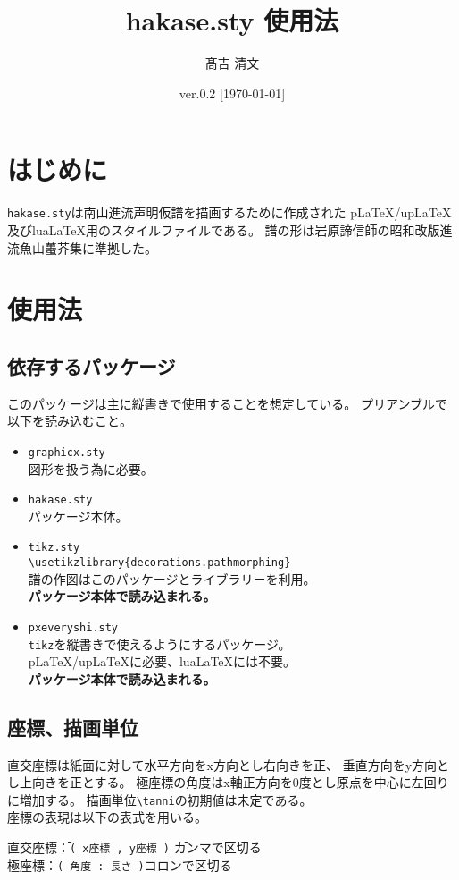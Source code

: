 \documentclass[a4paper,luatex]{l3doc}
\title{hakase.sty 使用法}
\author{髙吉 清文}
\date{ver.0.2 [\today]}
\begin{document}
\maketitle
\section{はじめに}
\verb|hakase.sty|は南山進流声明仮譜を描画するために作成された
p\LaTeX/up\LaTeX 及びlua\LaTeX 用のスタイルファイルである。
譜の形は岩原諦信師の昭和改版進流魚山蠆芥集に準拠した。
\section{使用法}
\subsection{依存するパッケージ}
このパッケージは主に縦書きで使用することを想定している。
プリアンブルで以下を読み込むこと。
\begin{itemize}
 \item \verb|graphicx.sty|\\
       図形を扱う為に必要。
 \item \verb|hakase.sty|\\
       パッケージ本体。
 \item \verb|tikz.sty|\\
       \verb|\usetikzlibrary{decorations.pathmorphing}|\\
       譜の作図はこのパッケージとライブラリーを利用。\\
       \textbf{パッケージ本体で読み込まれる。}
 \item \verb|pxeveryshi.sty|\\
       \verb|tikz|を縦書きで使えるようにするパッケージ。\\
       p\LaTeX/up\LaTeX に必要、lua\LaTeX には不要。\\
       \textbf{パッケージ本体で読み込まれる。}
\end{itemize}
\subsection{座標、描画単位}
直交座標は紙面に対して水平方向をx方向とし右向きを正、
垂直方向をy方向とし上向きを正とする。
極座標の角度はx軸正方向を0度とし原点を中心に左回りに増加する。
描画単位\verb|\tanni|の初期値は未定である。\\
座標の表現は以下の表式を用いる。
\begin{tabbing}
直交座標\=：\=\verb|( x座標 , y座標 )|  \=カンマで区切る \\
極座標\>：\>\verb|( 角度 : 長さ )|\>コロンで区切る	
\end{tabbing}
\end{document}
